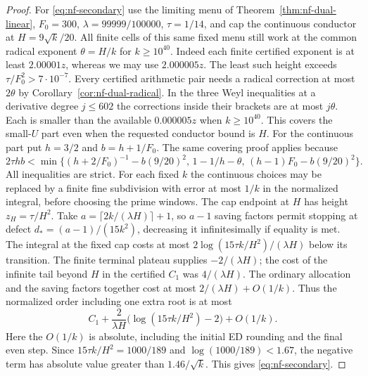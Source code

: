 \documentclass[11pt,letterpaper]{article}
\theoremstyle{definition}
\numberwithin{equation}{section}
\begin{document}
\begin{proof}
For \eqref{eq:nf-secondary} use the limiting menu of
Theorem~\ref{thm:nf-dual-linear}, $F_0=300$, $\lambda=99999/100000$,
$\tau=1/14$, and cap the continuous conductor at $H=9\sqrt{k}/20$.
All finite cells of this same fixed menu still work at the common
radical exponent $\theta=H/k$ for $k\ge10^{40}$. Indeed each
finite certified exponent is at least $2.00001z$, whereas we may use
$2.000005z$. The least such height exceeds $\tau/F_0^2>7\cdot10^{-7}$.
Every certified arithmetic pair needs a radical correction at most
$2\theta$ by Corollary~\ref{cor:nf-dual-radical}. In the three
Weyl inequalities at a derivative degree $j\le 602$ the corrections
inside their brackets are at most $j\theta$. Each is smaller
than the available $0.000005z$ when $k\ge10^{40}$. This covers
the small-$U$ part even when the requested conductor bound is $H$.
For the continuous part put $h=3/2$ and $b=h+1/F_0$. The same
covering proof applies because
\[
 2\tau hb<\min\{(h+2/F_0)^{-1}-b(9/20)^2,\,
             1-1/h-\theta,\,(h-1)F_0-b(9/20)^2\}.
\]
All inequalities are strict. For each fixed $k$ the continuous choices
may be replaced by a finite fine subdivision with error at most $1/k$
in the normalized integral, before choosing the prime windows. The cap endpoint at $H$ has height
$z_H=\tau/H^2$. Take $a=\lceil 2k/(\lambda H)\rceil+1$,
so $a-1$ saving factors permit stopping at defect
$d_*=(a-1)/(15k^2)$, decreasing it infinitesimally if equality
is met. The integral at the fixed cap costs at most
$2\log(15\tau k/H^2)/(\lambda H)$ below its transition.
The finite terminal plateau supplies $-2/(\lambda H)$; the cost
of the infinite tail beyond $H$ in the certified $C_1$ was
$4/(\lambda H)$. The ordinary allocation and the saving factors
together cost at most $2/(\lambda H)+O(1/k)$. Thus the normalized
order including one extra root is at most
\[
 C_1+\frac{2}{\lambda H}
       \bigl(\log(15\tau k/H^2)-2\bigr)+O(1/k).
\]
Here the $O(1/k)$ is absolute, including the initial ED rounding
and the final even step. Since $15\tau k/H^2=1000/189$ and
$\log(1000/189)<1.67$, the negative term has absolute value
greater than $1.46/\sqrt k$. This gives \eqref{eq:nf-secondary}.
\end{proof}
\end{document}
